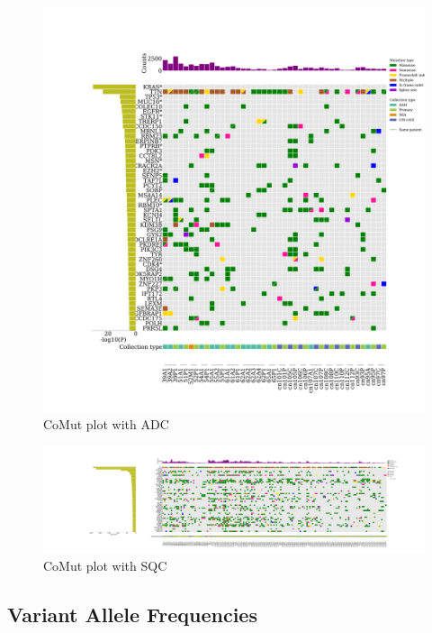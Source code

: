 \documentclass[a4paper]{article}
\begin{document}
            \begin{figure}[htbp]
                \centering
                \includegraphics[width=\linewidth]{figures/Mutect2/BWA-ADC.pdf}
                \caption{CoMut plot with ADC}
                \label{fig:comut-ADC}
            \end{figure}

            \begin{figure}[htbp]
                \centering
                \includegraphics[width=\linewidth]{figures/Mutect2/BWA-SQC.pdf}
                \caption{CoMut plot with SQC}
                \label{fig:comut-SQC}
            \end{figure}

        \subsection{Variant Allele Frequencies}
\end{document}
